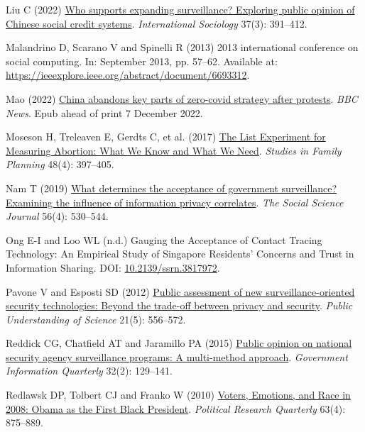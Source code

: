 \documentclass[
  letterpaper,
  DIV=11,
  numbers=noendperiod]{scrartcl}
\newlength{\cslhangindent}
\newenvironment{CSLReferences}[2] %
 {\begin{list}{}{%
  \setlength{\itemindent}{0pt}
  \setlength{\leftmargin}{0pt}
  \setlength{\parsep}{0pt}
  \ifodd #1
   \setlength{\leftmargin}{\cslhangindent}
   \setlength{\itemindent}{-1\cslhangindent}
  \fi
  \setlength{\itemsep}{#2\baselineskip}}}
 {\end{list}}
\begin{document}
\begin{CSLReferences}{1}{1}
Liu C (2022) \href{https://doi.org/10.1177/02685809221084446}{Who
supports expanding surveillance? Exploring public opinion of Chinese
social credit systems}. \emph{International Sociology} 37(3): 391--412.

Malandrino D, Scarano V and Spinelli R (2013) 2013 international
conference on social computing. In: September 2013, pp. 57--62.
Available at:
\url{https://ieeexplore.ieee.org/abstract/document/6693312}.

Mao (2022)
\href{https://www.bbc.com/news/world-asia-china-63855508}{China abandons
key parts of zero-covid strategy after protests}. \emph{BBC News}. Epub
ahead of print 7 December 2022.

Moseson H, Treleaven E, Gerdts C, et al. (2017)
\href{https://doi.org/10.1111/sifp.12042}{The List Experiment for
Measuring Abortion: What We Know and What We Need}. \emph{Studies in
Family Planning} 48(4): 397--405.

Nam T (2019) \href{https://doi.org/10.1016/j.soscij.2018.10.001}{What
determines the acceptance of government surveillance? Examining the
influence of information privacy correlates}. \emph{The Social Science
Journal} 56(4): 530--544.

Ong E-I and Loo WL (n.d.) Gauging the Acceptance of Contact Tracing
Technology: An Empirical Study of Singapore Residents' Concerns and
Trust in Information Sharing. DOI:
\href{https://doi.org/10.2139/ssrn.3817972}{10.2139/ssrn.3817972}.

Pavone V and Esposti SD (2012)
\href{https://doi.org/10.1177/0963662510376886}{Public assessment of new
surveillance-oriented security technologies: Beyond the trade-off
between privacy and security}. \emph{Public Understanding of Science}
21(5): 556--572.

Reddick CG, Chatfield AT and Jaramillo PA (2015)
\href{https://doi.org/10.1016/j.giq.2015.01.003}{Public opinion on
national security agency surveillance programs: A multi-method
approach}. \emph{Government Information Quarterly} 32(2): 129--141.

Redlawsk DP, Tolbert CJ and Franko W (2010)
\href{https://doi.org/10.1177/1065912910373554}{Voters, Emotions, and
Race in 2008: Obama as the First Black President}. \emph{Political
Research Quarterly} 63(4): 875--889.


\end{CSLReferences}
\end{document}
